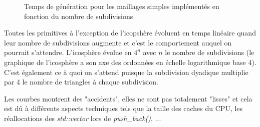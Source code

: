 \begin{figure}[h!]

	\caption{Temps de génération pour les maillages simples implémentés en fonction du nombre de subdivisions}
\end{figure}
\FloatBarrier

Toutes les primitives à l'exception de l'icopshère évoluent en temps linéaire quand leur nombre de subdivisions 
augmente et c'est le comportement auquel on pourrait s'attendre. L'icosphère évolue en $4^n$ avec $n$ le nombre 
de subdivisions (le graphique de l'icosphère a son axe des ordonnées en échelle logarithmique base 4). C'est 
également ce à quoi on s'attend puisque la subdivision dyadique multiplie par 4 le nombre de triangles à chaque subdivision.

Les courbes montrent des "accidents", elles ne sont pas totalement "lisses" et cela est dû à différents aspects techniques tels
que la taille des caches du CPU, les réallocations des \textit{std::vector} lors de \textit{push\_back()}, ...
